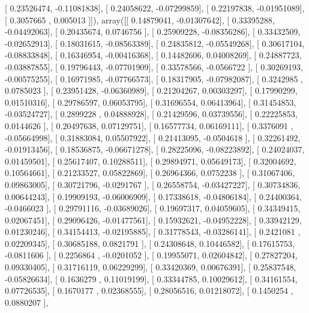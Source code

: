\documentclass{article}
\begin{document}
       [ 0.23526474, -0.11081838],
       [ 0.24058622, -0.07299859],
       [ 0.22197838, -0.01951089],
       [ 0.3057665 ,  0.005013  ]]), array([[ 0.14879041, -0.01307642],
       [ 0.33395288, -0.04492063],
       [ 0.20435674,  0.0746756 ],
       [ 0.25909228, -0.08356286],
       [ 0.33432509, -0.02652913],
       [ 0.18031615, -0.08563389],
       [ 0.24835812, -0.05549268],
       [ 0.30617104, -0.08833848],
       [ 0.16346954, -0.00416368],
       [ 0.14482606,  0.04008269],
       [ 0.24887723, -0.03887855],
       [ 0.19796443, -0.07701909],
       [ 0.33578566, -0.0566722 ],
       [ 0.30269193, -0.00575255],
       [ 0.16971985, -0.07766573],
       [ 0.18317905, -0.07982087],
       [ 0.3242985 ,  0.0785023 ],
       [ 0.23951428, -0.06360989],
       [ 0.21204267,  0.00303297],
       [ 0.17990299,  0.01510316],
       [ 0.29786597,  0.06053795],
       [ 0.31696554,  0.06413964],
       [ 0.31454853, -0.03524727],
       [ 0.2899228 ,  0.04888928],
       [ 0.21429596,  0.03739556],
       [ 0.22225853,  0.0144626 ],
       [ 0.20497638,  0.07129751],
       [ 0.16577734,  0.06169111],
       [ 0.3376091 , -0.05664998],
       [ 0.31883084,  0.05507922],
       [ 0.21413095, -0.0504618 ],
       [ 0.32261492, -0.01913456],
       [ 0.18536875, -0.06671278],
       [ 0.28225096, -0.08223892],
       [ 0.24024037,  0.01459501],
       [ 0.25617407,  0.10288511],
       [ 0.29894971,  0.05649173],
       [ 0.32004692,  0.10564661],
       [ 0.21233527,  0.05822869],
       [ 0.26964366,  0.0752238 ],
       [ 0.31067406,  0.09863005],
       [ 0.30721796, -0.0291767 ],
       [ 0.26558754, -0.03427227],
       [ 0.30734836,  0.00644243],
       [ 0.19909193, -0.06006909],
       [ 0.17338618, -0.04806184],
       [ 0.24400364, -0.0466023 ],
       [ 0.29791116, -0.03689026],
       [ 0.19697317,  0.04059605],
       [ 0.34349415,  0.02067451],
       [ 0.29096426, -0.01477561],
       [ 0.15932621, -0.04952228],
       [ 0.33942129,  0.01230246],
       [ 0.34154413, -0.02195885],
       [ 0.31778543, -0.03286141],
       [ 0.2421081 ,  0.02209345],
       [ 0.30685188,  0.0821791 ],
       [ 0.24308648,  0.10446582],
       [ 0.17615753, -0.0811606 ],
       [ 0.2256864 , -0.0201052 ],
       [ 0.19955071,  0.02604842],
       [ 0.27827204,  0.09330405],
       [ 0.31716119,  0.06229299],
       [ 0.33420369,  0.00676391],
       [ 0.25837548, -0.05826634],
       [ 0.1636279 ,  0.11019199],
       [ 0.33344785,  0.10029612],
       [ 0.34161554,  0.07726535],
       [ 0.1670177 ,  0.02368555],
       [ 0.28056516,  0.01218072],
       [ 0.1450254 ,  0.0880207 ],
\end{document}

